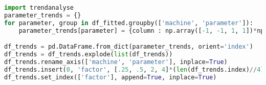 \begin{lstlisting}[language=python, caption=Befehle zum Ausführen von \texttt{trendanalyse.py}, label=lst:TrendanalyseCommand]
import trendanalyse
parameter_trends = {}
for parameter, group in df_fitted.groupby(['machine', 'parameter']):
    parameter_trends[parameter] = {column : np.array([-1, -1, 1, 1])*np.array(trendanalyse.trend_of_sequences(group.loc[parameter, 'change'].to_numpy(), group.loc[:,column].to_numpy(), x0=1, sequences=[(.25,1), (.5,1), (1,2), (1,4)])) for column in group.loc[:,'v_offset':'ISE']}

df_trends = pd.DataFrame.from_dict(parameter_trends, orient='index')
df_trends = df_trends.explode(list(df_trends))
df_trends.rename_axis(['machine', 'parameter'], inplace=True)
df_trends.insert(0, 'factor', [.25, .5, 2, 4]*(len(df_trends.index)//4))
df_trends.set_index(['factor'], append=True, inplace=True)
\end{lstlisting}